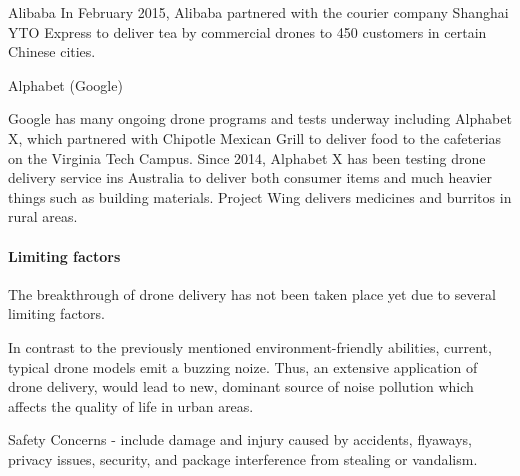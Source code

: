 Alibaba 
In February 2015, Alibaba partnered with the courier company Shanghai YTO Express to deliver tea by commercial drones to 450 customers in certain Chinese cities. 

Alphabet (Google) 

Google has many ongoing drone programs and tests underway including Alphabet X, which partnered with Chipotle Mexican Grill to deliver food to the cafeterias on the Virginia Tech Campus. Since 2014, Alphabet X has been testing drone delivery service ins Australia to deliver both consumer items and much heavier things such as building materials. Project Wing delivers medicines and burritos in rural areas. 





\paragraph{Limiting factors}
The breakthrough of drone delivery
has not been taken place yet due to several
limiting factors.

In contrast to the previously mentioned
environment-friendly abilities,
current, typical drone models emit a buzzing noize.
Thus, an extensive application of drone delivery,
would lead to new, dominant source of noise pollution 
which affects the quality of life in urban areas.



Safety Concerns - include damage and injury caused by 
accidents, 
flyaways, 
privacy issues, 
security, and 
package interference from stealing or vandalism. 

